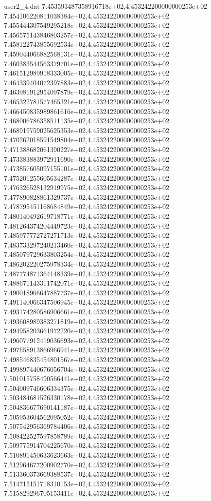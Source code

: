 \begin{filecontents}{user2_4.dat}
7.453593487358916718e+02,4.453242200000000253e+02
7.454106220811038384e+02,4.453242200000000253e+02
7.455444307549295218e+02,4.453242200000000253e+02
7.456575143846803257e+02,4.453242200000000253e+02
7.458122743855692534e+02,4.453242200000000253e+02
7.459044066882568131e+02,4.453242200000000253e+02
7.460383544563379701e+02,4.453242200000000253e+02
7.461512989918333005e+02,4.453242200000000253e+02
7.464339404072397883e+02,4.453242200000000253e+02
7.463981912954097879e+02,4.453242200000000253e+02
7.465322781577465321e+02,4.453242200000000253e+02
7.466450835989861616e+02,4.453242200000000253e+02
7.468006786358511135e+02,4.453242200000000253e+02
7.468919759025625353e+02,4.453242200000000253e+02
7.470262018591549804e+02,4.453242200000000253e+02
7.471388682061390227e+02,4.453242200000000253e+02
7.473383883972911690e+02,4.453242200000000253e+02
7.473857605097155101e+02,4.453242200000000253e+02
7.475201255605634287e+02,4.453242200000000253e+02
7.476326528132919975e+02,4.453242200000000253e+02
7.477890828861329737e+02,4.453242200000000253e+02
7.478795451168684849e+02,4.453242200000000253e+02
7.480140492619718771e+02,4.453242200000000253e+02
7.481264374204449723e+02,4.453242200000000253e+02
7.485977772727271713e+02,4.453242200000000253e+02
7.483733297240213460e+02,4.453242200000000253e+02
7.485079729633803254e+02,4.453242200000000253e+02
7.486202220275978334e+02,4.453242200000000253e+02
7.487774871364148339e+02,4.453242200000000253e+02
7.488671143311742071e+02,4.453242200000000253e+02
7.490018966647887737e+02,4.453242200000000253e+02
7.491140066347506945e+02,4.453242200000000253e+02
7.493174280586906661e+02,4.453242200000000253e+02
7.493608989383271819e+02,4.453242200000000253e+02
7.494958203661972220e+02,4.453242200000000253e+02
7.496077912419036693e+02,4.453242200000000253e+02
7.497658913866966941e+02,4.453242200000000253e+02
7.498546835454801567e+02,4.453242200000000253e+02
7.499897440676056704e+02,4.453242200000000253e+02
7.501015758490566441e+02,4.453242200000000253e+02
7.504009746606334375e+02,4.453242200000000253e+02
7.503484681526330178e+02,4.453242200000000253e+02
7.504836677690141187e+02,4.453242200000000253e+02
7.505953604562095052e+02,4.453242200000000253e+02
7.507542956369784406e+02,4.453242200000000253e+02
7.508422527597858789e+02,4.453242200000000253e+02
7.509775914704225670e+02,4.453242200000000253e+02
7.510891450633623663e+02,4.453242200000000253e+02
7.512964677200902770e+02,4.453242200000000253e+02
7.513360373669388537e+02,4.453242200000000253e+02
7.514715151718310153e+02,4.453242200000000253e+02
7.515829296705153411e+02,4.453242200000000253e+02

\end{filecontents}
